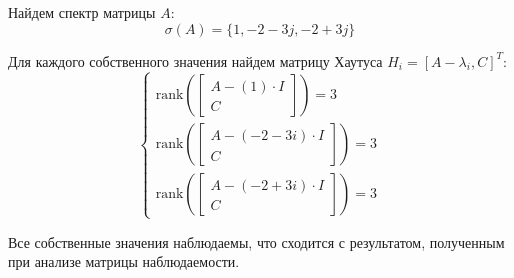 Найдем спектр матрицы $A$:
\begin{equation}
    \sigma(A) = \{1, -2-3j, -2+3j\}
\end{equation}

Для каждого собственного значения найдем матрицу Хаутуса $H_i = [A - \lambda_i, C]^T$:
\[
\begin{cases}
    \text{rank}\left(
    \begin{bmatrix}
    A - (1) \cdot I \\
    C
    \end{bmatrix}
    \right) = 3 \\
    \text{rank}\left(
    \begin{bmatrix}
    A - (-2 - 3i) \cdot I \\
    C
    \end{bmatrix}
    \right) = 3 \\
    \text{rank}\left(
    \begin{bmatrix}
    A - (-2 + 3i) \cdot I \\
    C
    \end{bmatrix}
    \right) = 3
\end{cases}
\]

Все собственные значения наблюдаемы, что сходится с результатом, полученным при анализе матрицы наблюдаемости.

